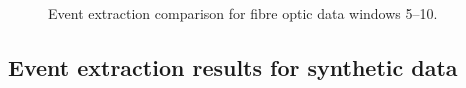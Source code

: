 \documentclass[a4paper,11pt]{article}
\begin{document}
\begin{figure}[!p]
{		\label{fig:events_8}
	}\\
	\caption{Event extraction comparison for fibre optic data windows 5--10.}
  \label{fig:events_set2}
\end{figure}

\newpage
\subsection{Event extraction results for synthetic data}
\end{document}
